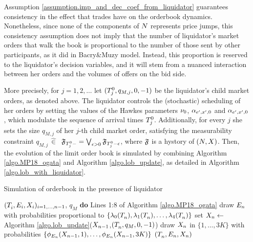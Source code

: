 \documentclass[10pt]{article}
\begin{document}
Assumption \ref{assumption.imp_and_dec_coef_from_liquidator} guarantees consistency in the effect that trades have on the orderbook dynamics. Nonetheless, since none of the components of $\multiCountingProc$ represents price jumps, this consistency assumption does not imply that the number of liquidator's market orders that  walk the book  is proportional to the number of those sent by other participants, as it did in Bacry\&Muzy model. Instead, this proportion is reserved to the liquidator's decision variables, and it will stem from a nuanced interaction between her orders and the volumes of offers on the bid side. 

More precisely, for $j=1,2,\dots$ let $(\arrivalTimes[0]_j, q_{M,j},0,-1)$ be the liquidator's child market orders, as denoted above. The liquidator controls the (stochastic) scheduling of her orders by setting the values of the Hawkes parameters $\baseRate_0$, $\impCoef_{\eone,\xone,0}$ and $\impCoef_{\eone,\xone,0}$, which modulate the sequence of arrival times $\arrivalTimes[0]_j$. Additionally, for every $j$ she sets the size $q_{M,j}$ of her $j$-th child market order, satisfying the measurability constraint $q_{M,j} \, \hat{\in} \, $ $ \filtrationF_{\arrivalTimes[0]_j -} = \bigvee_{\epsilon>0}\filtrationF_{\arrivalTimes[0]_j -\epsilon}$, where $\filtrationF$ is a hystory of $(\multiCountingProc,\stateVariable)$.  Then, the evolution of the limit order book is simulated by combining Algorithm \ref{algo.MP18_ogata} and Algorithm \ref{algo.lob_update}, as detailed in Algorithm \ref{algo.lob_with_liquidator}.

\begin{algorithm}[h]
\caption{Simulation of orderbook in the presence of liquidator}
\label{algo.lob_with_liquidator}
 \begin{algorithmic}[5]
  \REQUIRE $(\arrivalTimes[]_i,\event[i],\stateVariable_i)_{i=1,\dots,n-1}$, $q_M$
  \STATE \textbf{do} Lines 1:8 of Algorithm \ref{algo.MP18_ogata}
  \STATE draw $\event[n]$ with probabilities proportional to $\lbrace \intensity[0](\arrivalTimes[]_n),\intensity[1](\arrivalTimes[]_n),\dots,\intensity[4](\arrivalTimes[]_n)\rbrace$
  \STATE set $\stateVariable_n \leftarrow$ Algorithm \ref{algo.lob_update}($\stateVariable_{n-1}$,$(\arrivalTimes[]_n,q_M,0,-1)$)
  \ELSE
  \STATE draw $\stateVariable_n$ in $\lbrace 1,\dots,3K\rbrace$ with probabilities $\lbrace \transProb_{\event}(\stateVariable_{n-1},1), \dots,\transProb_{\event}(\stateVariable_{n-1},3K)\rbrace$
  \ENDIF
  \RETURN $(\arrivalTimes[]_n,\event[n],\stateVariable_n)$
 \end{algorithmic}
\end{algorithm}
\end{document}
